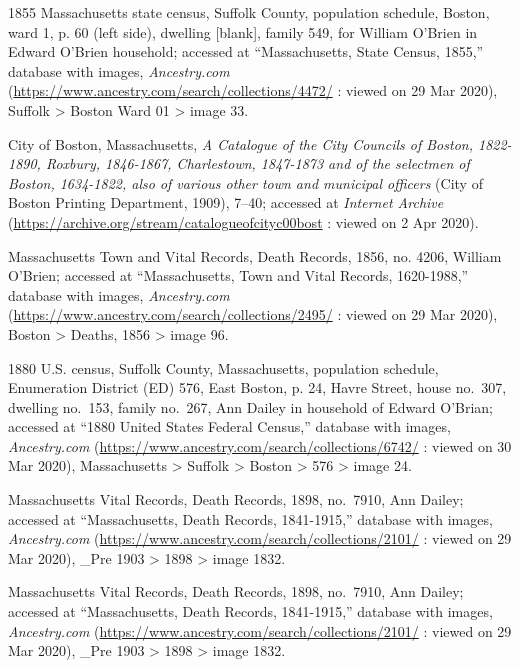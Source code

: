 \begin{thebibliography}{999}
1855 Massachusetts state census, Suffolk County, population schedule, Boston, ward 1, p. 60 (left side), dwelling [blank], family 549, for William O'Brien in Edward O'Brien household; accessed at ``Massachusetts, State Census, 1855,'' database with images, \textit{Ancestry.com} (\url{https://www.ancestry.com/search/collections/4472/} : viewed on 29 Mar 2020), Suffolk > Boston Ward 01 > image 33.

City of Boston, Massachusetts, \textit{A Catalogue of the City Councils of Boston, 1822-1890, Roxbury, 1846-1867, Charlestown, 1847-1873 and of the selectmen of Boston, 1634-1822, also of various other town and municipal officers} (City of Boston Printing Department, 1909), 7--40; accessed at \textit{Internet Archive} (\url{https://archive.org/stream/catalogueofcityc00bost} : viewed on 2 Apr 2020).

Massachusetts Town and Vital Records, Death Records, 1856, no. 4206, William O'Brien; accessed at ``Massachusetts, Town and Vital Records, 1620-1988,'' database with images, \textit{Ancestry.com} (\url{https://www.ancestry.com/search/collections/2495/} : viewed on 29 Mar 2020), Boston > Deaths, 1856 > image 96.

1880 U.S. census, Suffolk County, Massachusetts, population schedule, Enumeration District (ED) 576, East Boston, p. 24, Havre Street, house no.\ 307, dwelling no.\ 153, family no.\ 267, Ann Dailey in household of Edward O'Brian; accessed at ``1880 United States Federal Census,'' database with images, \textit{Ancestry.com} (\url{https://www.ancestry.com/search/collections/6742/} : viewed on 30 Mar 2020), Massachusetts > Suffolk > Boston > 576 > image 24.

Massachusetts Vital Records, Death Records, 1898, no.\ 7910, Ann Dailey; accessed at ``Massachusetts, Death Records, 1841-1915,'' database with images, \textit{Ancestry.com} (\url{https://www.ancestry.com/search/collections/2101/} : viewed on 29 Mar 2020), \_Pre 1903 > 1898 > image 1832.

Massachusetts Vital Records, Death Records, 1898, no.\ 7910, Ann Dailey; accessed at ``Massachusetts, Death Records, 1841-1915,'' database with images, \textit{Ancestry.com} (\url{https://www.ancestry.com/search/collections/2101/} : viewed on 29 Mar 2020), \_Pre 1903 > 1898 > image 1832.


\end{thebibliography}